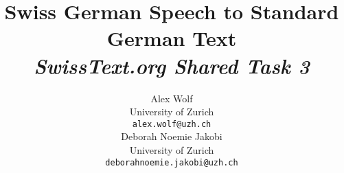 \documentclass[11pt,a4paper,twocolumns]{article}
\title{Swiss German Speech to Standard German Text\\
    \normalsize\textit{SwissText.org Shared Task 3}}
\author{Alex Wolf\\
  University of Zurich \\
  \texttt{alex.wolf@uzh.ch} \\\And
  Deborah Noemie Jakobi\\
  University of Zurich \\
  \texttt{deborahnoemie.jakobi@uzh.ch} \\}
\date{}
\begin{document}
\maketitle












\cite{stuff}




\end{document}
